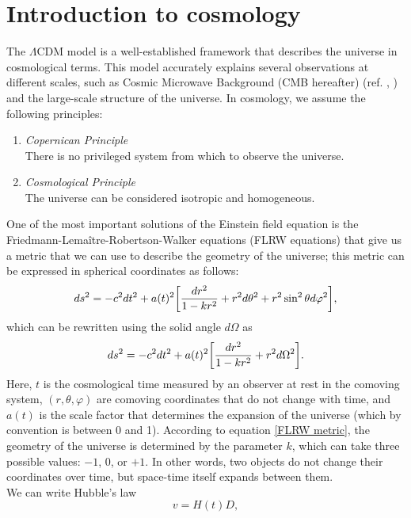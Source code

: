\section{Introduction to cosmology}
The $\Lambda$CDM model is a well-established framework that describes the universe in cosmological terms. This model accurately explains several observations at different scales, such as Cosmic Microwave Background (CMB hereafter) (ref. \cite{Planck2020}, \cite{Nature_dark_matter_simulation}) and the large-scale structure of the universe.
In cosmology, we assume the following principles:
\begin{enumerate}
    \item \textit{Copernican Principle}\\There is no privileged system from which to observe the universe.
    \item \textit{Cosmological Principle}\\The universe can be considered isotropic and homogeneous.
\end{enumerate}
One of the most important solutions of the Einstein field equation is the Friedmann-Lema\^itre-Robertson-Walker equations (FLRW equations) that give us a metric that we can use to describe the geometry of the universe; this metric can be expressed in spherical coordinates as follows:
\begin{equation}
    ds^2 = -c^2 dt^2 + a(t)^2 \qty[\frac{dr^2}{1-kr^2} + r^2 d\theta^2 + r^2 \sin^2{\theta} d\varphi^2],
\end{equation}
which can be rewritten using the solid angle $d\Omega$ as
\begin{equation} \label{FLRW metric}
    ds^2 = -c^2 dt^2 + a(t)^2 \qty[\frac{dr^2}{1-kr^2} + r^2 d\Omega^2].
\end{equation}
Here, $t$ is the cosmological time measured by an observer at rest in the comoving system, $(r, \theta, \varphi)$ are comoving coordinates that do not change with time, and $a(t)$ is the scale factor that determines the expansion of the universe (which by convention is between 0 and 1). According to equation \eqref{FLRW metric}, the geometry of the universe is determined by the parameter $k$, which can take three possible values: $-1$, $0$, or $+1$. In other words, two objects do not change their coordinates over time, but space-time itself expands between them.\\ We can write Hubble's law
\begin{equation} \label{Hubble law}
    v = H(t) D,
\end{equation}

